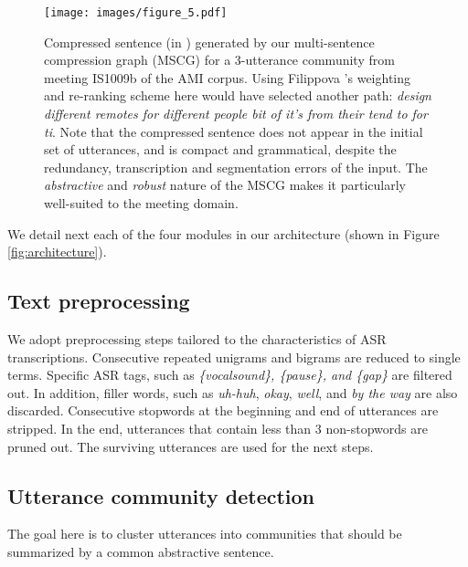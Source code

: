 \documentclass[11pt,a4paper]{article}
\begin{document}
\begin{figure*}[!ht]
\centering
\captionsetup{size=small}
\begin{minipage}[c]{0.34\textwidth}
\caption{
Compressed sentence (in \textbf{\color{red}{bold red}}) generated by our multi-sentence compression graph (MSCG) for a 3-utterance community from meeting IS1009b of the AMI corpus. Using Filippova 's weighting and re-ranking scheme here would have selected another path: \textit{design different remotes for different people bit of it's from their tend to for ti}. Note that the compressed sentence does not appear in the initial set of utterances, and is compact and grammatical, despite the redundancy, transcription and segmentation errors of the input. The \textit{abstractive} and \textit{robust} nature of the MSCG makes it particularly well-suited to the meeting domain.
} \label{fig:msc_illustration}
\end{minipage}\hfill
\begin{minipage}[c]{0.6\textwidth}
\texttt{[image: images/figure\_5.pdf]}
\end{minipage}

\end{figure*}

We detail next each of the four modules in our architecture (shown in Figure \ref{fig:architecture}).
\subsection{Text preprocessing}
We adopt preprocessing steps tailored to the characteristics of ASR transcriptions. 
Consecutive repeated unigrams and bigrams are reduced to single terms.
Specific ASR tags, such as \textit{\{vocalsound\}, \{pause\}, and \{gap\}} are filtered out.
In addition, filler words, such as \textit{uh-huh}, \textit{okay}, \textit{well}, and \textit{by the way} are also discarded.
Consecutive stopwords at the beginning and end of utterances are stripped.
In the end, utterances that contain less than 3 non-stopwords are pruned out. The surviving utterances are used for the next steps.

\subsection{Utterance community detection} \label{subsec:utterance_community_detection}

The goal here is to cluster utterances into communities that should be summarized by a common abstractive sentence. 
\end{document}
